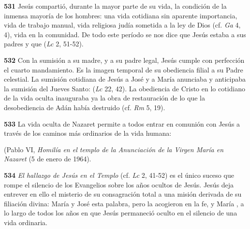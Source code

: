 \textbf{531} Jesús compartió, durante la mayor parte de su vida, la condición de la inmensa mayoría de los hombres: una vida cotidiana sin aparente importancia, vida de trabajo manual, vida religiosa judía sometida a la ley de Dios (cf. \emph{Ga} 4, 4), vida en la comunidad. De todo este período se nos dice que Jesús estaba  a sus padres y que  (\emph{Lc} 2, 51-52).

\textbf{532} Con la sumisión a su madre, y a su padre legal, Jesús cumple con perfección el cuarto mandamiento. Es la imagen temporal de su obediencia filial a su Padre celestial. La sumisión cotidiana de Jesús a José y a María anunciaba y anticipaba la sumisión del Jueves Santo:  (\emph{Lc} 22, 42). La obediencia de Cristo en lo cotidiano de la vida oculta inauguraba ya la obra de restauración de lo que la desobediencia de Adán había destruido (cf. \emph{Rm} 5, 19).

\textbf{533} La vida oculta de Nazaret permite a todos entrar en comunión con Jesús a través de los caminos más ordinarios de la vida humana:

 (Pablo VI, \emph{Homilía en el templo de la Anunciación de la Virgen María en Nazaret} (5 de enero de 1964).

\textbf{534} \emph{El hallazgo de Jesús en el Templo} (cf. \emph{Lc} 2, 41-52) es el único suceso que rompe el silencio de los Evangelios sobre los años ocultos de Jesús. Jesús deja entrever en ello el misterio de su consagración total a una misión derivada de su filiación divina:  María y José  esta palabra, pero la acogieron en la fe, y María , a lo largo de todos los años en que Jesús permaneció oculto en el silencio de una vida ordinaria.

